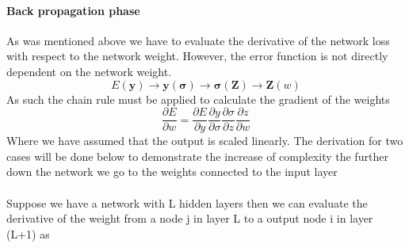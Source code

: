 \documentclass[12pt]{article}
\begin{document}
\paragraph{Back propagation phase}

As was mentioned above we have to evaluate the derivative of the network loss with respect to the network weight. However, the error function is not directly dependent on the network weight.
\begin{equation}
	E\left(\textbf{y}\right) \rightarrow \textbf{y}(\bm{\sigma}) \rightarrow \bm{\sigma}(\textbf{Z}) \rightarrow \textbf{Z}(w)
\end{equation}
As such the chain rule must be applied to calculate the gradient of the weights
\begin{equation}
	\frac{\partial E}{\partial w} = \frac{\partial E}{\partial y}\frac{\partial y}{\partial \sigma}\frac{\partial \sigma}{\partial z}\frac{\partial z}{\partial w}
\end{equation}
Where we have assumed that the output is scaled linearly. The derivation for two cases will be done below to demonstrate the increase of complexity the further down the network we go to the weights connected to the input layer
\\
\\
Suppose we have a network with L hidden layers then we can evaluate the derivative of the weight from a node j in layer L to a output node i in layer (L+1) as 
\end{document}
